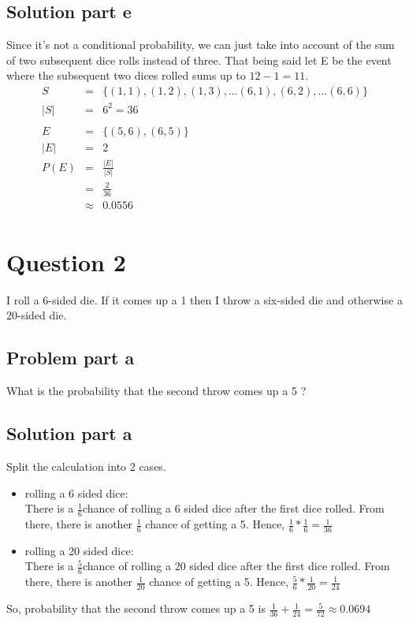 \documentclass[12pt]{article}%
\newcommand\abs[1]{\left|#1\right|}
\begin{document}
\subsection*{Solution part e}
Since it's not a conditional probability, we can just take into account of the sum of two subsequent dice rolls instead of three. That being said let E be the event where the subsequent two dices rolled sums up to $12 - 1 = 11$. 
\begin{eqnarray*}
S & = &\{(1,1), (1,2),  (1,3), ... (6,1), (6,2), ...(6,6)\} \\
\abs{S} & = & 6^2 = 36 \\ \\
E & = & \{(5,6),(6,5)\} \\
\abs{E} & = & 2 \\ 
P(E) & = & \frac{\abs{E}}{\abs{S}} \\
	 & = & \frac{2}{36} \\
	 & \approx & 0.0556 \\
\end{eqnarray*}



\newpage
\section*{Question 2}
I roll a 6-sided die. If it comes up a 1 then I throw a six-sided die and otherwise a 20-sided die.
\subsection*{Problem part a}
What is the probability that the second throw comes up a 5 ?
\subsection*{Solution part a}
Split the calculation into 2 cases. 
\begin{itemize}
\item rolling a 6 sided dice: \\ There is a $\frac{1}{6}$chance of rolling a 6 sided dice after the first dice rolled. From there, there is another $\frac{1}{6}$ chance of getting a 5. Hence, $\frac{1}{6} * \frac{1}{6} = \frac{1}{36}$
\item rolling a 20 sided dice: \\ There is a $\frac{5}{6}$chance of rolling a 20 sided dice after the first dice rolled. From there, there is another $\frac{1}{20}$ chance of getting a 5. Hence, $\frac{5}{6} * \frac{1}{20} = \frac{1}{24}$
\end{itemize}
So, probability that the second throw comes up a 5 is $\frac{1}{36}+\frac{1}{24}=\frac{5}{72}\approx 0.0694$
\end{document}
